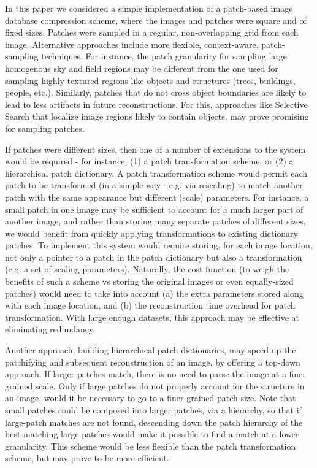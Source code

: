 In this paper we considered a simple implementation of a patch-based image database compression scheme, where the images and patches were square and of fixed sizes. Patches were sampled in a regular, non-overlapping grid from each image.  Alternative approaches include more flexible, context-aware, patch-sampling techniques. For instance, the patch granularity for sampling large homogenous sky and field regions may be different from the one used for sampling highly-textured regions like objects and structures (trees, buildings, people, etc.). Similarly, patches that do not cross object boundaries are likely to lead to less artifacts in future reconstructions. For this, approaches like Selective Search \cite{UijlingsIJCV2013} that localize image regions likely to contain objects, may prove promising for sampling patches.

If patches were different sizes, then one of a number of extensions to the system would be required - for instance, (1) a patch transformation scheme, or (2) a hierarchical patch dictionary. A patch transformation scheme would permit each patch to be transformed (in a simple way - e.g. via rescaling) to match another patch with the same appearance but different (scale) parameters. For instance, a small patch in one image may be sufficient to account for a much larger part of another image, and rather than storing many separate patches of different sizes, we would benefit from quickly applying transformations to existing dictionary patches. To implement this system would require storing, for each image location, not only a pointer to a patch in the patch dictionary but also a transformation (e.g. a set of scaling parameters). Naturally, the cost function (to weigh the benefits of such a scheme vs storing the original images or even equally-sized patches) would need to take into account (a) the extra parameters stored along with each image location, and (b) the reconstruction time overhead for patch transformation. With large enough datasets, this approach may be effective at eliminating redundancy.

Another approach, building hierarchical patch dictionaries, may speed up the patchifying and subsequent reconstruction of an image, by offering a top-down approach. If larger patches match, there is no need to parse the image at a finer-grained scale. Only if large patches do not properly account for the structure in an image, would it be necessary to go to a finer-grained patch size. Note that small patches could be composed into larger patches, via a hierarchy, so that if large-patch matches are not found, descending down the patch hierarchy of the best-matching large patches would make it possible to find a match at a lower granularity. This scheme would be less flexible than the patch transformation scheme, but may prove to be more efficient. 

